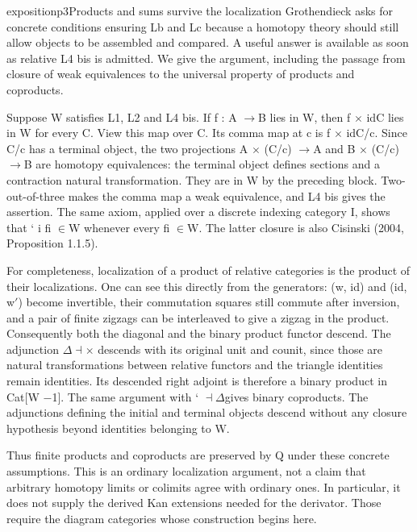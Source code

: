 \begin{dcomment}{exposition}{p3}{Products and sums survive the localization}
Grothendieck asks for concrete conditions ensuring Lb and Lc because a homotopy theory should still allow objects to be assembled and compared. A useful answer is available as soon as relative L4 bis is admitted. We give the argument, including the passage from closure of weak equivalences to the universal property of products and coproducts.

Suppose W satisfies L1, L2 and L4 bis. If f : A \ensuremath{\to}B lies in W, then f \ensuremath{\times} idC lies in W for every C. View this map over C. Its comma map at c is f \ensuremath{\times} idC/c. Since C/c has a terminal object, the two projections A \ensuremath{\times} (C/c) \ensuremath{\to}A and B \ensuremath{\times} (C/c) \ensuremath{\to}B are homotopy equivalences: the terminal object defines sections and a contraction natural transformation. They are in W by the preceding block. Two-out-of-three makes the comma map a weak equivalence, and L4 bis gives the assertion. The same axiom, applied over a discrete indexing category I, shows that ` i fi \ensuremath{\in}W whenever every fi \ensuremath{\in}W. The latter closure is also Cisinski (2004, Proposition 1.1.5).

For completeness, localization of a product of relative categories is the product of their localizations. One can see this directly from the generators: (w, id) and (id, w\ensuremath{\prime}) become invertible, their commutation squares still commute after inversion, and a pair of finite zigzags can be interleaved to give a zigzag in the product. Consequently both the diagonal and the binary product functor descend. The adjunction \ensuremath{\Delta}\ensuremath{\dashv}\ensuremath{\times} descends with its original unit and counit, since those are natural transformations between relative functors and the triangle identities remain identities. Its descended right adjoint is therefore a binary product in Cat[W \ensuremath{-}1]. The same argument with ` \ensuremath{\dashv}\ensuremath{\Delta}gives binary coproducts. The adjunctions defining the initial and terminal objects descend without any closure hypothesis beyond identities belonging to W.

Thus finite products and coproducts are preserved by Q under these concrete assumptions. This is an ordinary localization argument, not a claim that arbitrary homotopy limits or colimits agree with ordinary ones. In particular, it does not supply the derived Kan extensions needed for the derivator. Those require the diagram categories whose construction begins here.

\end{dcomment}

